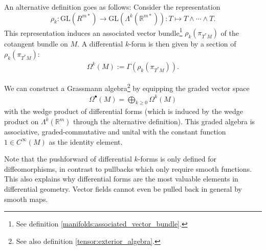     \begin{adefinition}
        An alternative definition goes as follows: Consider the representation \[\rho_k:\text{GL}(R^{m*})\rightarrow\text{GL}(\Lambda^k(\mathbb{R}^{m*})): T\mapsto T\wedge\cdots\wedge T.\] This representation induces an associated vector bundle\footnote{See definition \ref{manifolds:associated_vector_bundle}.} $\rho_k(\pi_{T^*M})$ of the cotangent bundle on $M$. A differential $k$-form is then given by a section of $\rho_k(\pi_{T^*M})$:
        \begin{gather}
            \Omega^k(M) := \Gamma(\rho_k(\pi_{T^*M})).
        \end{gather}
    \end{adefinition}

    \begin{construct}
        We can construct a Grassmann algebra\footnote{See also definition \ref{tensor:exterior_algebra}.} by equipping the graded vector space
        \begin{gather}
            \Omega^\bullet(M) = \bigoplus_{k\geq0}\Omega^k(M)
        \end{gather}
        with the wedge product of differential forms (which is induced by the wedge product on $\Lambda^k(\mathbb{R}^m)$ through the alternative definition). This graded algebra is associative, graded-commutative and unital with the constant function $1\in C^{\infty}(M)$ as the identity element.
    \end{construct}

    \begin{remark*}
        Note that the pushforward of differential $k$-forms is only defined for diffeomorphisms, in contrast to pullbacks which only require smooth functions. This also explains why differential forms are the most valuable elements in differential geometry. Vector fields cannot even be pulled back in general by smooth maps.
    \end{remark*}

